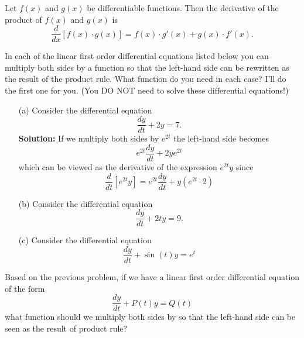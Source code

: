 \begin{thm}
    Let $f(x)$ and $g(x)$ be differentiable functions.  Then the derivative of the product
    of $f(x)$ and $g(x)$ is 
    \[ \frac{d}{dx}\left[ f(x) \cdot g(x) \right] = f(x) \cdot g'(x) + g(x) \cdot f'(x). \]
\end{thm}

\begin{problem}
    In each of the linear first order differential equations listed below you can multiply both sides by a
    function so that the left-hand side can be rewritten as the result of the product
    rule.  What function do you need in each case?  I'll do the first one for you. (You DO
    NOT need to solve these differential equations!)
    \begin{enumerate}
        \item[(a)] Consider the differential equation
            \[ \frac{dy}{dt} + 2y = 7. \]
            {\color{blue} {\bf Solution:} }If we multiply both sides by $e^{2t}$ the left-hand side becomes
            \[ e^{2t} \frac{dy}{dt} + 2y e^{2t} \]
            which can be viewed as the derivative of the expression $e^{2t} y$ since 
            \[ \frac{d}{dt}\left[ e^{2t} y \right] = e^{2t} \frac{dy}{dt} + y \left(
            e^{2t} \cdot 2
        \right) \]
    \item[(b)] Consider the differential equation
        \[ \frac{dy}{dt} + 2ty = 9. \]
    \item[(c)] Consider the differential equation 
        \[ \frac{dy}{dt} + \sin(t) y = e^t \]
    \end{enumerate}
\end{problem}

\begin{problem}
    Based on the previous problem, if we have a linear first order differential equation
    of the form
    \[ \frac{dy}{dt} + P(t) y = Q(t) \]
    what function should we multiply both sides by so that the left-hand side can be seen
    as the result of product rule?
\end{problem}

